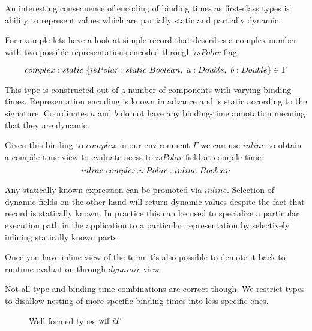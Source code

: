 An interesting consequence of encoding of binding times as first-class types is
ability to represent values which are partially static and partially dynamic.

For example lets have a look at simple record that describes a complex number with
two possible representations encoded through $isPolar$ flag:

\begin{equation}\nonumber
    complex: static\ \{ isPolar: static\ Boolean,\ a: Double,\ b: Double \} \in \Gamma
\end{equation}

This type is constructed out of a number of components with varying binding times.
Representation encoding is known in advance and is static according to the signature.
Coordinates $a$ and $b$ do not have any binding-time annotation meaning that they are
dynamic.

Given this binding to $complex$ in our environment $\Gamma$ we can use $inline$ to obtain
a compile-time view to evaluate acess to $isPolar$ field at compile-time:
\begin{equation}\nonumber
  inline\ complex.isPolar: inline\ Boolean
\end{equation}

Any statically known expression can be promoted via $inline$. Selection of dynamic fields
on the other hand will return dynamic values despite the fact that record is statically known.
In practice this can be used to specialize a particular execution path in the application to
a particular representation by selectively inlining statically known parts.

Once you have inline view of the term it's also possible to demote it back to runtime evaluation
through $dynamic$ view.

Not all type and binding time combinations are correct though. We restrict types
to disallow nesting of more specific binding times into less specific ones.

\begin{figure}[H]

  {}

  {}

  {}
\caption {Well formed types $\text{wff}\ i T$}
\end{figure}

